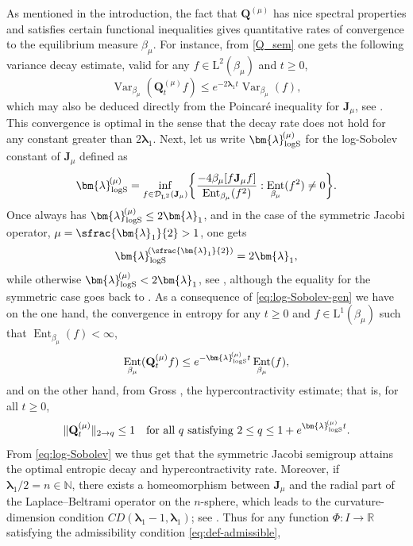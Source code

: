 \documentclass[10pt]{amsart}
\theoremstyle{plain}
\theoremstyle{definition}
\DeclareMathOperator{\Var}{Var}
\DeclareMathOperator{\Ent}{Ent}
\newcommand{\N}{\mathbb{N}}
\newcommand{\R}{\mathbb{R}}
\newcommand{\calD}{\mathcal{D}}
\newcommand{\Leb}{\mathrm{L}}
\newcommand{\calJd}{\mathbf{J}}
\newcommand{\lam}{{\bm{\lambda}_1}}
\newcommand{\logSob}[1][\mo]{\bm{\lambda}_{\mathrm{logS}}^{\hspace{-0.06cm}(#1)}}
\newcommand{\Q}[1][\mo]{\mathbf{Q}^{({#1})}}
\newcommand{\gab}[1][\lam,\mo]{{\beta_{#1}}}
\let\mo\mu
\begin{document}
\begin{appendix}
As mentioned in the introduction, the fact that $\Q$ has nice spectral properties and satisfies certain functional inequalities gives quantitative rates of convergence to the equilibrium measure $\gab[\mo]$. For instance, from \eqref{Q_sem} one gets the following variance decay estimate, valid for any $f \in \Leb^2(\gab[\mo])$ and $t \geq 0$,
\begin{equation*}
\Var_{\gab[\mo]}(\Q_t f ) \leq e^{-2\lam t} \Var_{\gab[\mo]}(f),
\end{equation*}
which may also be deduced directly from the Poincaré inequality for $\calJd_\mo$, see \cite[Chap.\,4.2]{Bakry_Book}. This convergence is optimal in the sense that the decay rate does not hold for any constant greater than $2\lam$. Next, let us write $\logSob[\mo]$ for the log-Sobolev constant of $\calJd_\mo$ defined as
\begin{equation}
\label{eq:log-Sobolev-gen}
\logSob[\mo] = \inf_{f \in \calD_{\Leb^2}(\calJd_\mo)} \biggl\{ \frac{-4\gab[\mo] [f \calJd_\mo f]}{\Ent_{\gab[\mo]} (f^2)} :\Ent_{\gab[\mo]} (f^2) \neq 0 \biggr\}.
\end{equation}
Once always has $\logSob[\mo] \leq 2\lam$, and in the case of the symmetric Jacobi operator, \ie
$\mo = \sfrac{\lam}{2} > 1$, one gets
\begin{equation}
\label{eq:log-Sobolev}
\logSob[\sfrac{\lam}{2}] = 2\lam,
\end{equation}
while otherwise $\logSob[\mo] < 2\lam$, see \eg \cite{fontenas:1998}, although the equality for the symmetric case goes back to \cite{pearson:1992}. As a consequence of \eqref{eq:log-Sobolev-gen} we have on the one hand, the convergence in entropy for any $t \geq 0$ and $f \in \Leb^1(\gab[\mo])$ such that $\Ent_{\gab[\mo]}(f) < \infty$,
\begin{equation*}
\Ent_{\gab[\mo]} (\Q[\mo]_tf) \leq e^{-\logSob[\mo] t} \Ent_{\gab[\mo]} (f),
\end{equation*}
and on the other hand, from Gross \cite{Gross}, the hypercontractivity estimate; that is, for all $t\geq 0$,
\begin{equation*}
\|\Q[\mo]_t\|_{2 \to q} \leq 1\quad \textrm{for all $q$ satisfying } 2\leq q \leq 1+e^{ \logSob[\mo] t}.
\end{equation*}
From \eqref{eq:log-Sobolev} we thus get that the symmetric Jacobi semigroup attains the optimal entropic decay and hypercontractivity rate. Moreover, if $\lam/2 = n \in \N$, there exists a homeomorphism between $\calJd_\mo$ and the radial part of the Laplace--Beltrami operator on the $n$-sphere, which leads to the curvature-dimension condition $CD(\lam-1,\lam)$; see \cite{Bakry_Book}. Thus for any function $\Phi \colon I \to \R$ satisfying the admissibility condition \eqref{eq:def-admissible},

\end{appendix}
\end{document}

